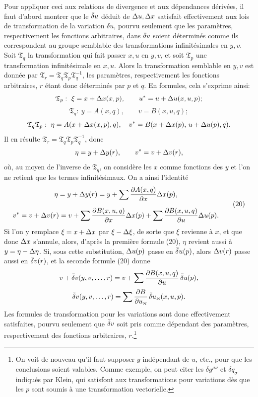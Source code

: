 Pour appliquer ceci aux relations de divergence et aux dépendances dérivées, il faut d'abord montrer que le \(\bar{\delta} u\) déduit de \(\Delta u,\Delta x\) satisfait effectivement aux lois de transformation de la variation \(\delta u\), pourvu seulement que les paramètres, respectivement les fonctions arbitraires, dans \(\bar{\delta} v\) soient déterminés comme ils correspondent au groupe semblable des transformations infinitésimales en \(y,v\). Soit \(\mathfrak T_q\) la transformation qui fait passer \(x,u\) en \(y,v\), et soit \(\mathfrak T_p\) une transformation infinitésimale en \(x,u\). Alors la transformation semblable en \(y,v\) est donnée par \(\mathfrak T_r=\mathfrak T_q\mathfrak T_p\mathfrak T_q^{-1}\), les paramètres, respectivement les fonctions arbitraires, \(r\) étant donc déterminés par \(p\) et \(q\). En formules, cela s'exprime ainsi:
\[
\mathfrak T_p:\ \xi=x+\Delta x(x,p),\qquad u^*=u+\Delta u(x,u,p);
\]
\[
\mathfrak T_q:\ y=A(x,q),\qquad v=B(x,u,q);
\]
\[
\mathfrak T_q\mathfrak T_p:\ \eta=A(x+\Delta x(x,p),q),\quad
v^*=B(x+\Delta x(p),\,u+\Delta u(p),q).
\]
Il en résulte \(\mathfrak T_r=\mathfrak T_q\mathfrak T_p\mathfrak T_q^{-1}\), donc
\[
\eta=y+\Delta y(r),\qquad v^*=v+\Delta v(r),
\]
où, au moyen de l'inverse de \(\mathfrak T_q\), on considère les \(x\) comme fonctions des \(y\) et l'on ne retient que les termes infinitésimaux. On a ainsi l'identité
\begin{equation}
\begin{gathered}
\eta=y+\Delta y(r)=y+\sum\frac{\partial A(x,q)}{\partial x}\Delta x(p),\\[0.55em]
v^*=v+\Delta v(r)=v+\sum\frac{\partial B(x,u,q)}{\partial x}\Delta x(p)
+\sum\frac{\partial B(x,u,q)}{\partial u}\Delta u(p).
\end{gathered}
\tag{20}
\end{equation}
Si l'on y remplace \(\xi=x+\Delta x\) par \(\xi-\Delta \xi\), de sorte que \(\xi\) revienne à \(x\), et que donc \(\Delta x\) s'annule, alors, d'après la première formule (20), \(\eta\) revient aussi à \(y=\eta-\Delta\eta\). Si, sous cette substitution, \(\Delta u(p)\) passe en \(\bar{\delta} u(p)\), alors \(\Delta v(r)\) passe aussi en \(\bar{\delta} v(r)\), et la seconde formule (20) donne
\[
v+\bar{\delta} v(y,v,\ldots,r)=v+\sum\frac{\partial B(x,u,q)}{\partial u}\,\bar{\delta} u(p),
\]
\[
\bar{\delta} v(y,v,\ldots,r)=\sum\frac{\partial B}{\partial u_\varkappa}\,\bar{\delta} u_\varkappa(x,u,p).
\]
Les formules de transformation pour les variations sont donc effectivement satisfaites, pourvu seulement que \(\bar{\delta} v\) soit pris comme dépendant des paramètres, respectivement des fonctions arbitraires, \(r\).\footnote{On voit de nouveau qu'il faut supposer \(y\) indépendant de \(u\), etc., pour que les conclusions soient valables. Comme exemple, on peut citer les \(\delta g^{\mu\nu}\) et \(\delta q_\sigma\) indiqués par Klein, qui satisfont aux transformations pour variations dès que les \(p\) sont soumis à une transformation vectorielle.}

